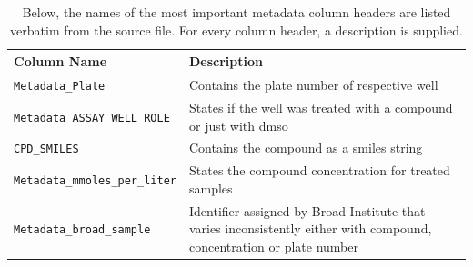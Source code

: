 \begin{table}[H]
	\begin{center}
		\caption[Important Metadata Columns]{Below, the names of the most important metadata column headers are listed verbatim from the source file. For every column header, a description is supplied.}
		\label{tab:metaheader}
		\begin{tabular}{lp{8cm}}
			\toprule
			Column Name & Description\\			
			\midrule
			\texttt{Metadata\_Plate} & Contains the plate number of respective well \\
			\texttt{Metadata\_ASSAY\_WELL\_ROLE}& States if the well was treated with a compound or just with \ac{dmso}\\
			\texttt{CPD\_SMILES}& Contains the compound as a \ac{smiles} string\\
			\texttt{Metadata\_mmoles\_per\_liter}& States the compound concentration for treated samples\\
			\texttt{Metadata\_broad\_sample}& Identifier assigned by Broad Institute that varies inconsistently either with compound, concentration or plate number\\
			\bottomrule
		\end{tabular}
	\end{center}
\end{table}\noindent
%
%
